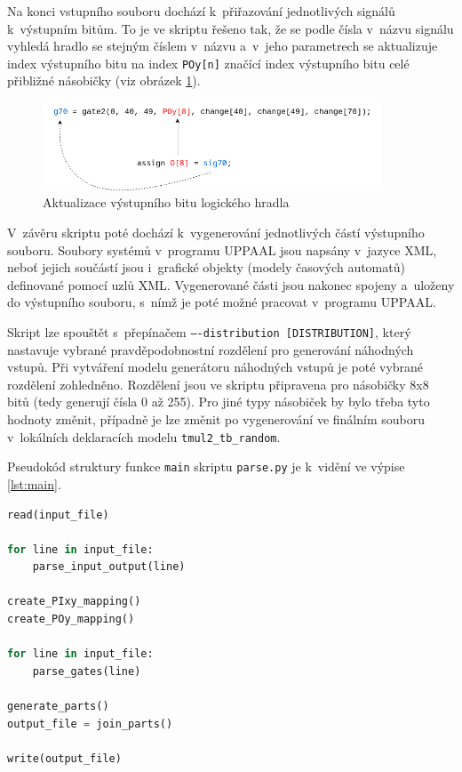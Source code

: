 Na konci vstupního souboru dochází k~přiřazování jednotlivých signálů k~výstupním bitům. To je ve skriptu řešeno tak, že se podle čísla v~názvu signálu vyhledá hradlo se stejným číslem v~názvu a~v~jeho parametrech se aktualizuje index výstupního bitu na index \texttt{POy[n]} značící index výstupního bitu celé přibližné násobičky (viz obrázek \ref{fig:gate_output}).

\begin{figure}[H]
    \centering
    \includegraphics[width=0.9\textwidth]{obrazky-figures/gate_output.png}
    \caption{Aktualizace výstupního bitu logického hradla}
    \label{fig:gate_output}
\end{figure}

V~závěru skriptu poté dochází k~vygenerování jednotlivých částí výstupního souboru. Soubory systémů v~programu UPPAAL jsou napsány v~jazyce XML, neboť jejich součástí jsou i~grafické objekty (modely časových automatů) definované pomocí uzlů XML. Vygenerované části jsou nakonec spojeny a~uloženy do výstupního souboru, s~nímž je poté možné pracovat v~programu UPPAAL.

Skript lze spouštět s~přepínačem \texttt{----distribution [DISTRIBUTION]}, který nastavuje vybrané pravděpodobnostní rozdělení pro generování náhodných vstupů. Při vytváření modelu generátoru náhodných vstupů je poté vybrané rozdělení zohledněno. Rozdělení jsou ve skriptu připravena pro násobičky 8x8 bitů (tedy generují čísla 0 až 255). Pro jiné typy násobiček by bylo třeba tyto hodnoty změnit, případně je lze změnit po vygenerování ve finálním souboru v~lokálních deklaracích modelu \texttt{tmul2\_tb\_random}.

Pseudokód struktury funkce \texttt{main} skriptu \texttt{parse.py} je k~vidění ve výpise \ref{lst:main}.

\begin{lstlisting}[language={Python}, caption={Pseudokód hlavní části skriptu parse.py}, label={lst:main}]
read(input_file)

for line in input_file:
    parse_input_output(line)

create_PIxy_mapping()
create_POy_mapping()

for line in input_file:
    parse_gates(line)

generate_parts()
output_file = join_parts()

write(output_file)
\end{lstlisting}

